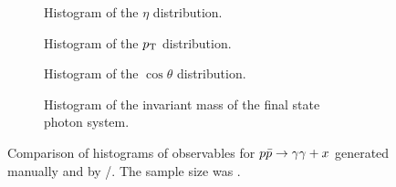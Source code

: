\begin{figure}[hp]
  \centering
  \begin{subfigure}{.49\textwidth}
    \centering {}
    \caption{\label{fig:pdf-pt} Histogram of the \(\eta\)
      distribution.}
  \end{subfigure}
  \begin{subfigure}{.49\textwidth}
    \centering {}
    \caption{\label{fig:pdf-pt} Histogram of the \(p_\mathrm{T}\)
      distribution.}
  \end{subfigure}
  \begin{subfigure}{.49\textwidth}
    \centering {}
    \caption{\label{fig:pdf-pt} Histogram of the \(\cos\theta\)
      distribution.}
  \end{subfigure}
  \begin{subfigure}{.49\textwidth}
    \centering {}
    \caption[Histogram of the invariant mass of the final state photon
    system.]{\label{fig:pdf-pt} Histogram of the invariant mass of the
      final state photon system. %
    }
  \end{subfigure}
  \caption{\label{fig:pdf-histos}Comparison of histograms of
    observables for \(p\bar{p}\rightarrow\gamma\gamma + x\) generated manually and by
    \sherpa/\rivet. The sample size was \protect
    .}
\end{figure}
